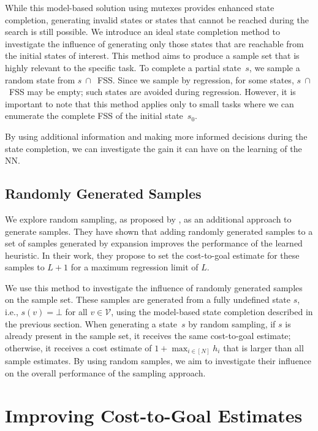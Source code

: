 While this model-based solution using mutexes provides enhanced state completion, generating invalid states or states that cannot be reached during the search is still possible. We introduce an ideal state completion method to investigate the influence of generating only those states that are reachable from the initial states of interest. This method aims to produce a sample set that is highly relevant to the specific task. To complete a partial state~$s$, we sample a random state from $s~\cap$~FSS. Since we sample by regression, for some states, $s~\cap$~FSS may be empty; such states are avoided during regression. However, it is important to note that this method applies only to small tasks where we can enumerate the complete FSS of the initial state~$s_0$.

By using additional information and making more informed decisions during the state completion, we can investigate the gain it can have on the learning of the NN.

\subsection{Randomly Generated Samples}
\label{sec:random-samples}

We explore random sampling, as proposed by \citet{otoole2022sampling}, as an additional approach to generate samples. They have shown that adding randomly generated samples to a set of samples generated by expansion improves the performance of the learned heuristic. In their work, they propose to set the cost-to-goal estimate for these samples to $L+1$ for a maximum regression limit of $L$.

We use this method to investigate the influence of randomly generated samples on the sample set. These samples are generated from a fully undefined state $s$, i.e., $s(v) = \bot$ for all $v \in \mathcal{V}$, using the model-based state completion described in the previous section. When generating a state~$s$ by random sampling, if $s$ is already present in the sample set, it receives the same cost-to-goal estimate; otherwise, it receives a cost estimate of $1+\max_{i\in[N]} h_i$ that is larger than all sample estimates. By using random samples, we aim to investigate their influence on the overall performance of the sampling approach.

\section{Improving Cost-to-Goal Estimates}
\label{sec:cost-to-goal-estimates}

